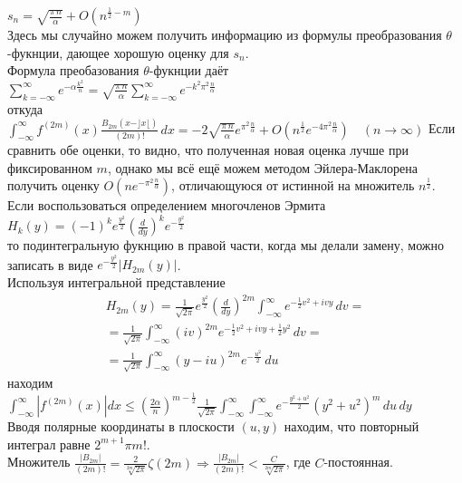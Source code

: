 \documentclass{report}
\begin{document}
$s_n=\sqrt{\frac{\pi\,n}{\alpha}}+O\left(n^{\frac{1}{2}-m}\right)$ \\
Здесь мы случайно можем получить информацию из формулы преобразования $\theta$-фукнции, дающее хорошую оценку для $s_n$. \\
Формула преобазования $\theta$-фукнции даёт \\
$\sum_{k=-\infty}^{\infty}e^{-\alpha\frac{k^2}{n}}=\sqrt{\frac{\pi\,n}{\alpha}}\sum_{k=-\infty}^{\infty}e^{-k^2\pi^2\frac{n}{\alpha}}$ \\ откуда \\
$\int_{-\infty}^{\infty}f^{(2m)}(x)\frac{B_{2m}(x-\rfloor{x}\lfloor)}{(2m)!}\,dx=-2\sqrt{\frac{\pi\,n}{\alpha}}e^{\pi^2\frac{n}{\alpha}}+O\left(n^\frac{1}{2}e^{-4\pi^2\frac{n}{\alpha}}\right)\quad(n\to\infty)$
Если сравнить обе оценки, то видно, что полученная новая оценка лучше при фиксированном $m$, однако мы всё ещё можем методом Эйлера-Маклорена получить оценку $O\left(ne^{-\pi^2\frac{n}{\alpha}}\right)$, 
отличающуюся от истинной на множитель $n^\frac{1}{2}$. \\
Если воспользоваться определением многочленов Эрмита \\
$H_k(y)=(-1)^{k}e^\frac{y^2}{2}\left(\frac{d}{dy}\right)^{k}e^{-\frac{y^2}{2}}$ \\
то подинтегральную фукнцию в правой части, когда мы делали замену, можно записать в виде $e^{-\frac{y^2}{2}}|H_{2m}(y)|$. \\
Используя интегральной представление \\
\begin{multline}
H_{2m}(y)=\frac{1}{\sqrt{2\pi}}e^{\frac{y^2}{2}}\left(\frac{d}{dy}\right)^{2m}\int_{-\infty}^{\infty}e^{-\frac{1}{2}v^2+ivy}\,dv = \\
=\frac{1}{\sqrt{2\pi}}\int_{-\infty}^{\infty}(iv)^{2m}e^{-\frac{1}{2}v^2+ivy+\frac{1}{2}y^2}\,dv = \\
=\frac{1}{\sqrt{2\pi}}\int_{-\infty}^{\infty}(y-iu)^{2m}e^{-\frac{u^2}{2}}\, du
\end{multline}
находим \\
$\int_{-\infty}^{\infty}|f^{(2m)}(x)|dx\le \left(\frac{2\alpha}{n}\right)^{m-\frac{1}{2}}\frac{1}{\sqrt{2\pi}}\int_{-\infty}^{\infty}\int_{-\infty}^{\infty}e^{-\frac{y^2+u^2}{2}}(y^2+u^2)^{m}\,du\,dy$ \\
Вводя полярные координаты в плоскости $(u,y)$ находим, что повторный интеграл равне $2^{m+1}\pi{m!}$. \\
Множитель $\frac{|B_{2m}|}{(2m)!}=\frac{2}{\sqrt[2m]{2\pi}}\zeta(2m)\Rightarrow\frac{|B_{2m}|}{(2m)!}<\frac{C}{\sqrt[2m]{2\pi}}$, где $C$-постоянная. \\
\end{document}
